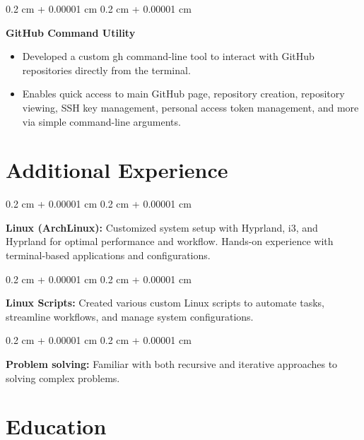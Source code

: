 \documentclass[10pt, letterpaper]{article}
\newenvironment{highlights}{
    \begin{itemize}[
        topsep=0.10 cm,
        parsep=0.10 cm,
        partopsep=0pt,
        itemsep=0pt,
        leftmargin=0.4 cm + 10pt
    ]
}{
    \end{itemize}
} %
\newenvironment{onecolentry}{
    \begin{adjustwidth}{
        0.2 cm + 0.00001 cm
    }{
        0.2 cm + 0.00001 cm
    }
}{
    \end{adjustwidth}
} %
\begin{document}
        \vspace{0.2 cm}

        \begin{onecolentry}
            \textbf{GitHub Command Utility}
            \begin{highlights}
                \item Developed a custom gh command-line tool to interact with GitHub repositories directly from the terminal.
                \item Enables quick access to main GitHub page, repository creation, repository viewing, SSH key management, personal access token management, and more via simple command-line arguments.
            \end{highlights}
        \end{onecolentry}




    \section{Additional Experience}




        \begin{onecolentry}
            \textbf{Linux (ArchLinux):} Customized system setup with Hyprland, i3, and Hyprland for optimal performance and workflow. Hands-on experience with terminal-based applications and configurations.
        \end{onecolentry}

        \vspace{0.2 cm}

        \begin{onecolentry}
            \textbf{Linux Scripts:} Created various custom Linux scripts to automate tasks, streamline workflows, and manage system configurations.
        \end{onecolentry}

        \vspace{0.2 cm}

        \begin{onecolentry}
            \textbf{Problem solving:} Familiar with both recursive and iterative approaches to solving complex problems.
        \end{onecolentry}



    \section{Education}
\end{document}
